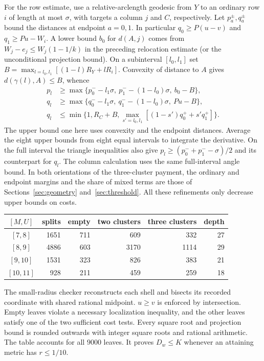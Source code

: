 \documentclass[11pt,a4paper]{article}
\theoremstyle{definition}
\begin{document}
For the row estimate, use a relative-arclength geodesic from $Y$ to an
ordinary row $i$ of length at most $\sigma$, with targets a column $j$
and $C$, respectively. Let $p_a^\pm,q_a^\pm$ bound the distances at
endpoint $a=0,1$. In particular $q_0\ge P(u-v)$ and
$q_1\ge Pu-W_i$. A lower bound $b_0$ for $d(A,j)$ comes from
$W_j-e_j\le W_j(1-1/k)$ in the preceding relocation estimate (or the
unconditional projection bound). On a subinterval $[l_0,l_1]$ set
$B=\max_{l=l_0,l_1}[(1-l)R_Y+lR_i]$. Convexity of distance to $A$
gives $d(\gamma(l),A)\le B$, whence
\[
\begin{split}
 p_l&\ge\max\{p_0^--l_1\sigma,\ p_1^--(1-l_0)\sigma,\ b_0-B\},\\
 q_l&\ge\max\{q_0^--l_1\sigma,\ q_1^--(1-l_0)\sigma,\ Pu-B\},\\
 q_l&\le\min\{1,R_C+B,
       \max_{s'=l_0,l_1}[(1-s')q_0^++s' q_1^+]\}.
\end{split}
\]
The upper bound one here uses convexity and the endpoint distances.
Average the eight upper bounds from eight equal intervals to integrate
the derivative. On the full interval the triangle inequalities also
give $p_l\ge(p_0^-+p_1^- -\sigma)/2$ and its counterpart for $q_l$.
The column calculation uses the same full-interval angle bound. In both
orientations of the three-cluster payment, the ordinary and endpoint
margins and the share of mixed terms are those of
Sections~\ref{sec:geometry} and~\ref{sec:threshold}. All these refinements
only decrease upper bounds on costs.

\begin{center}
\begin{tabular}{c|r|r|r|r|r}
$[M,U]$&splits&empty&two clusters&three clusters&depth\\\hline
$[7,8]$&1651&711&609&332&27\\
$[8,9]$&4886&603&3170&1114&29\\
$[9,10]$&1531&323&826&383&21\\
$[10,11]$&928&211&459&259&18
\end{tabular}
\end{center}
The small-radius checker reconstructs each shell and bisects its recorded
coordinate with shared rational midpoint. $u\ge v$ is enforced by
intersection. Empty leaves violate a necessary localization inequality,
and the other leaves satisfy one of the two sufficient cost tests.
Every square root and projection bound is rounded outwards with integer
square roots and rational arithmetic. The table accounts for all $9000$
leaves. It proves $D_w\le K$ whenever an attaining metric has $r\le1/10$.
\end{document}
